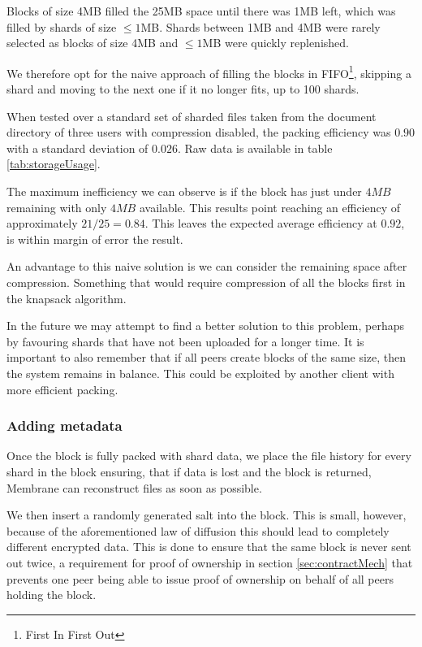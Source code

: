 \documentclass[11pt, a4paper, twoside]{report}
\begin{document}
Blocks of size 4MB filled the 25MB space until there was 1MB left, which was filled by shards of size $\leq1$MB. Shards between 1MB and 4MB were rarely selected as blocks of size 4MB and $\leq1$MB were quickly replenished.

We therefore opt for the naive approach of filling the blocks in FIFO\footnote{First In First Out}, skipping a shard and moving to the next one if it no longer fits, up to 100 shards.

When tested over a standard set of sharded files taken from the document directory of three users with compression disabled, the packing efficiency was $0.90$ with a standard deviation of $0.026$. Raw data is available in table \ref{tab:storageUsage}.

The maximum inefficiency we can observe is if the block has just under $4MB$ remaining with only $4MB$ available. This results point reaching an efficiency of approximately $21/25 = 0.84$. This leaves the expected average efficiency at $0.92$, is within margin of error the result. 

An advantage to this naive solution is we can consider the remaining space after compression. Something that would require compression of all the blocks first in the knapsack algorithm.

In the future we may attempt to find a better solution to this problem, perhaps by favouring shards that have not been uploaded for a longer time. It is important to also remember that if all peers create blocks of the same size, then the system remains in balance. This could be exploited by another client with more efficient packing.

\subsubsection{Adding metadata}

Once the block is fully packed with shard data, we place the file history for every shard in the block ensuring, that if data is lost and the block is returned, Membrane can reconstruct files as soon as possible.

We then insert a randomly generated salt into the block. This is small, however, because of the aforementioned law of diffusion \citep{shannon1945mathematical} this should lead to completely different encrypted data. This is done to ensure that the same block is never sent out twice, a requirement for proof of ownership in section \ref{sec:contractMech} that prevents one peer being able to issue proof of ownership on behalf of all peers holding the block.
\end{document}
